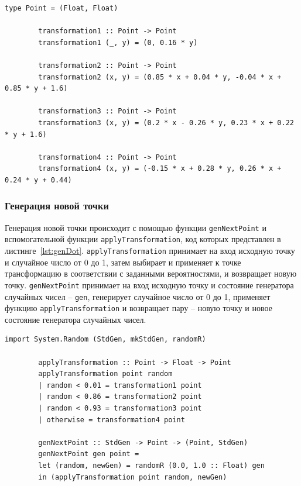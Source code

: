 \documentclass[a4paper, final]{article}
\begin{document}
	\begin{lstlisting}[mathescape=true, caption={Код функций, резализующих аффинные преобразования над точками для построения папоротника Барнсли.}, label={lst:trfs}]
		type Point = (Float, Float)
		
		transformation1 :: Point -> Point
		transformation1 (_, y) = (0, 0.16 * y)
		
		transformation2 :: Point -> Point
		transformation2 (x, y) = (0.85 * x + 0.04 * y, -0.04 * x + 0.85 * y + 1.6)
		
		transformation3 :: Point -> Point
		transformation3 (x, y) = (0.2 * x - 0.26 * y, 0.23 * x + 0.22 * y + 1.6)
		
		transformation4 :: Point -> Point
		transformation4 (x, y) = (-0.15 * x + 0.28 * y, 0.26 * x + 0.24 * y + 0.44)
	\end{lstlisting}
	
	\subsubsection{Генерация новой точки}
	
	Генерация новой точки происходит с помощью функции \texttt{genNextPoint} и вспомогательной функции \texttt{applyTransformation}, код которых представлен в листинге~\ref{lst:genDot}. \texttt{applyTransformation} принимает на вход исходную точку и случайное число от 0 до 1, затем выбирает и применяет к точке трансформацию в соответствии с заданными вероятностями, и возвращает новую точку. \texttt{genNextPoint} принимает на вход исходную точку и состояние генератора случайных чисел -- \texttt{gen}, генерирует случайное число от 0 до 1, применяет функцию \texttt{applyTransformation} и возвращает пару -- новую точку и новое состояние генератора случайных чисел. 
	
	\begin{lstlisting}[caption={Код функций для генераций новых точек в папоротнике Барнсли.}, label={lst:genDot}]
		import System.Random (StdGen, mkStdGen, randomR)
		
		applyTransformation :: Point -> Float -> Point
		applyTransformation point random
		| random < 0.01 = transformation1 point
		| random < 0.86 = transformation2 point
		| random < 0.93 = transformation3 point
		| otherwise = transformation4 point
		
		genNextPoint :: StdGen -> Point -> (Point, StdGen)
		genNextPoint gen point =
		let (random, newGen) = randomR (0.0, 1.0 :: Float) gen
		in (applyTransformation point random, newGen)
	\end{lstlisting}
	
\end{document}
